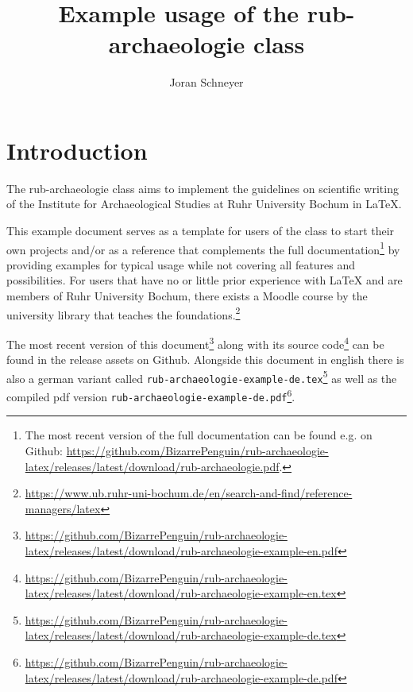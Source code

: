 \documentclass{rub-archaeologie}
\title{Example usage of the \textsf{rub-archaeologie} class}
\author{Joran Schneyer}
\begin{document}
    \maketitle

    \tableofcontents
    \clearpage

    \section{Introduction}
    The \textsf{rub-archaeologie} class aims to implement the guidelines on scientific writing of the Institute for Archaeological Studies at Ruhr University Bochum in \LaTeX{}.
    
    This example document serves as a template for users of the class to start their own projects and/or as a reference that complements the full documentation\footnote{The most recent version of the full documentation can be found e.g. on Github: \url{https://github.com/BizarrePenguin/rub-archaeologie-latex/releases/latest/download/rub-archaeologie.pdf}.} by providing examples for typical usage while not covering all features and possibilities. For users that have no or little prior experience with \LaTeX{} and are members of Ruhr University Bochum, there exists a Moodle course by the university library that teaches the foundations.\footnote{\url{https://www.ub.ruhr-uni-bochum.de/en/search-and-find/reference-managers/latex}}

    The most recent version of this document\footnote{\url{https://github.com/BizarrePenguin/rub-archaeologie-latex/releases/latest/download/rub-archaeologie-example-en.pdf}} along with its source code\footnote{\url{https://github.com/BizarrePenguin/rub-archaeologie-latex/releases/latest/download/rub-archaeologie-example-en.tex}} can be found in the release assets on Github. Alongside this document in english there is also a german variant called \texttt{rub-archaeologie-example-de.tex}\footnote{\url{https://github.com/BizarrePenguin/rub-archaeologie-latex/releases/latest/download/rub-archaeologie-example-de.tex}} as well as the compiled pdf version \texttt{rub-archaeologie-example-de.pdf}\footnote{\url{https://github.com/BizarrePenguin/rub-archaeologie-latex/releases/latest/download/rub-archaeologie-example-de.pdf}}.
\end{document}

